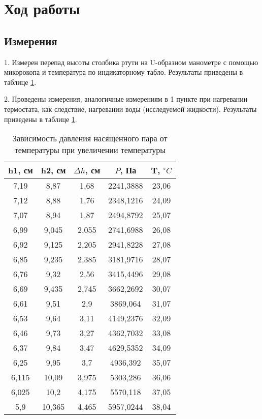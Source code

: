 \section{Ход работы}
\subsection{Измерения}

1. Измерен перепад высоты столбика ртути на U-образном манометре с помощью микорокопа и температура по индикаторному табло. Результаты приведены в таблице \ref*{table:vverh}.

2. Проведены измерения, аналогичные измерениям в 1 пункте при нагревании термостата, как следствие, нагревании воды (исследуемой жидкости). Результаты приведены в таблице \ref*{table:vverh}.

\begin{table}[ht]
    \centering
    \begin{tabular}{|c|c|c|c|c|}
        \hline
        h1, см & h2, см & $\Delta h$, см & $P$, Па & T, $\text{}^\circ C$\\
        \hline
        7,19 & 8,87 & 1,68 & 2241,3888 & 23,06 \\
		\hline
		7,12 & 8,88 & 1,76 & 2348,1216 & 24,09 \\
		\hline
		7,07 & 8,94 & 1,87 & 2494,8792 & 25,07 \\
		\hline
		6,99 & 9,045 & 2,055 & 2741,6988 & 26,08 \\
		\hline
		6,92 & 9,125 & 2,205 & 2941,8228 & 27,08 \\
		\hline
		6,85 & 9,235 & 2,385 & 3181,9716 & 28,07 \\
		\hline
		6,76 & 9,32 & 2,56 & 3415,4496 & 29,08 \\
		\hline
		6,69 & 9,435 & 2,745 & 3662,2692 & 30,07 \\
		\hline
		6,61 & 9,51 & 2,9 & 3869,064 & 31,07 \\
		\hline
		6,53 & 9,64 & 3,11 & 4149,2376 & 32,09 \\
		\hline
		6,46 & 9,73 & 3,27 & 4362,7032 & 33,08 \\
		\hline
		6,37 & 9,84 & 3,47 & 4629,5352 & 34,09 \\
		\hline
		6,25 & 9,95 & 3,7 & 4936,392 & 35,07 \\
		\hline
		6,115 & 10,09 & 3,975 & 5303,286 & 36,06 \\
		\hline
		6,025 & 10,2 & 4,175 & 5570,118 & 37,05 \\
		\hline
		5,9 & 10,365 & 4,465 & 5957,0244 & 38,04 \\
		\hline
    \end{tabular}
    \caption{Зависимость давления насященного пара от температуры при увеличении температуры}
    \label{table:vverh}
\end{table}


